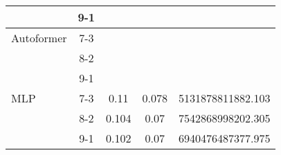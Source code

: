 \begin{table}[h!]
\begin{tabular}{|l|c|c|c|c|}
    \rowcolor{green!30}  & 9-1 &  &  &  \\ \hline
    \rowcolor{white} Autoformer & 7-3 &  &  &  \\ \hline
    \rowcolor{white}  & 8-2 &  &  &  \\ \hline
    \rowcolor{white}  & 9-1 &  &  &  \\ \hline
    \rowcolor{white} MLP & 7-3 & 0.11 & 0.078 & 5131878811882.103 \\ \hline
    \rowcolor{white}  & 8-2 & 0.104 & 0.07 & 7542868998202.305   \\ \hline
    \rowcolor{white}  & 9-1 & 0.102 & 0.07 & 6940476487377.975 \\ \hline
    \end{tabular}
    \end{table}